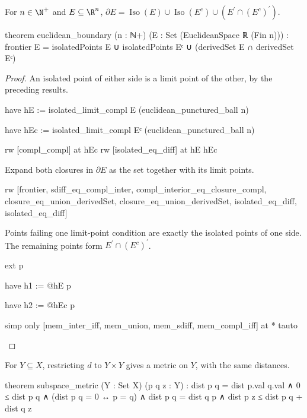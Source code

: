 \begin{proposition}
  \label{ma:thm:properties-of-boundary-in-rn}
  For $n\in\N^{+}$ and $E\subseteq\R^{n}$, $\partial
    E=\operatorname{Iso}(E)\cup\operatorname{Iso}(E^{c})\cup(E^{\prime}\cap(E^{c})^{\prime})$.

  \begin{lean}
    theorem euclidean_boundary (n : ℕ+)
        (E : Set (EuclideanSpace ℝ (Fin n))) :
        frontier E = isolatedPoints E ∪ isolatedPoints Eᶜ ∪
          (derivedSet E ∩ derivedSet Eᶜ)
  \end{lean}
\end{proposition}

\begin{proof}
  An isolated point of either side is a limit point of the other, by the preceding results.

  \begin{lean}
    have hE := isolated_limit_compl E (euclidean_punctured_ball n)

    have hEc := isolated_limit_compl Eᶜ (euclidean_punctured_ball n)

    rw [compl_compl] at hEc
    rw [isolated_eq_diff] at hE hEc
  \end{lean}

  Expand both closures in $\partial E$ as the set together with its limit points.

  \begin{lean}
    rw [frontier, sdiff_eq_compl_inter,
      compl_interior_eq_closure_compl, closure_eq_union_derivedSet,
      closure_eq_union_derivedSet, isolated_eq_diff, isolated_eq_diff]
  \end{lean}

  Points failing one limit-point condition are exactly the isolated points of one side.
  The remaining points form $E^{\prime}\cap(E^c)^{\prime}$.

  \begin{lean}
    ext p

    have h1 := @hE p

    have h2 := @hEc p

    simp only [mem_inter_iff, mem_union, mem_sdiff, mem_compl_iff] at *
    tauto
  \end{lean}
\end{proof}

\begin{proposition}
  \label{ma:lem:subspace-metric}
  For $Y\subseteq X$, restricting $d$ to $Y\times Y$ gives a metric on $Y$, with the same
  distances.

  \begin{lean}
    theorem subspace_metric (Y : Set X) (p q z : Y) :
        dist p q = dist p.val q.val ∧ 0 ≤ dist p q ∧
        (dist p q = 0 ↔ p = q) ∧ dist p q = dist q p ∧
        dist p z ≤ dist p q + dist q z
  \end{lean}
\end{proposition}

